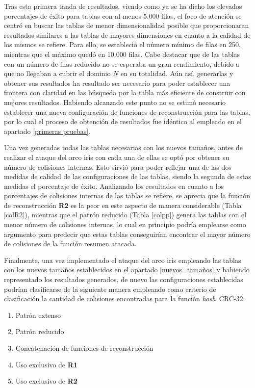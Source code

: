 \documentclass[12pt,spanish,listoffigures,listoftables,listofalgorithms]{tfgetsinf}
\newcommand{\hash}{\textit{hash}}
\begin{document}
Tras esta primera tanda de resultados, viendo como ya se ha dicho los elevados porcentajes de éxito para tablas con al menos 5.000 filas, el foco de atención se centró en buscar las tablas de menor dimensionalidad posible que proporcionaran resultados similares a las tablas de mayores dimensiones en cuanto a la calidad de los mismos se refiere. Para ello, se estableció el número mínimo de filas en 250, mientras que el máximo quedó en 10.000 filas. Cabe destacar que de las tablas con un número de filas reducido no se esperaba un gran rendimiento, debido a que no llegaban a cubrir el dominio $N$ en su totalidad. Aún así, generarlas y obtener sus resultados ha resultado ser necesario para poder establecer una frontera con claridad en las búsqueda por la tabla más eficiente de construir con mejores resultados. Habiendo alcanzado este punto no se estimó necesario establecer una nueva configuración de funciones de reconstrucción para las tablas, por lo cual el proceso de obtención de resultados fue idéntico al empleado en el apartado \ref{primeras pruebas}.

Una vez generadas todas las tablas necesarias con los nuevos tamaños, antes de realizar el ataque del arco iris con cada una de ellas se optó por obtener su número de colisiones internas. Esto sirvió para poder reflejar una de las dos medidas de calidad de las configuraciones de las tablas, siendo la segunda de estas medidas el porcentaje de éxito. Analizando los resultados en cuanto a los porcentajes de colisiones internas de las tablas se refiere, se aprecia que la función de reconstrucción \textbf{R2} es la peor en este aspecto de manera considerable (Tabla \ref{colR2}), mientras que el patrón reducido (Tabla \ref{colpp}) genera las tablas con el menor número de colisiones internas, lo cual en principio podría emplearse como argumento para predecir que estas tablas conseguirían encontrar el mayor número de colisiones de la función resumen atacada.

Finalmente, una vez implementado el ataque del arco iris empleando las tablas con los nuevos tamaños establecidos en el apartado \ref{nuevos_tamaños} y habiendo representado los resultados generados, de nuevo las configuraciones establecidas podrían clasificarse de la siguiente manera empleando como criterio de clasificación la cantidad de colisiones encontradas para la función \hash~CRC-32:

\begin{enumerate}

    \item Patrón extenso
    
    \item Patrón reducido
    
    \item Concatenación de funciones de reconstrucción
    
    \item Uso exclusivo de \textbf{R1}
    
    \item Uso exclusivo de \textbf{R2}
    
\end{enumerate}
\end{document}
